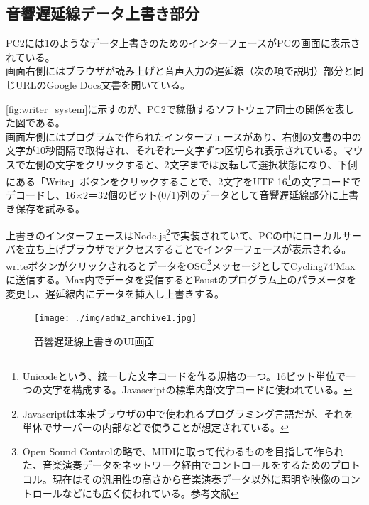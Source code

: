 \documentclass[a4paper,report]{jsbook}
\begin{document}
\subsection{音響遅延線データ上書き部分}\label{ux97f3ux97ffux9045ux5ef6ux7ddaux30c7ux30fcux30bfux4e0aux66f8ux304dux90e8ux5206}

PC2には\cref{fig:adm_writer}のようなデータ上書きのためのインターフェースがPCの画面に表示されている。\\
画面右側にはブラウザが読み上げと音声入力の遅延線（次の項で説明）部分と同じURLのGoogle
Docs文書を開いている。

\cref{fig:writer_system}に示すのが、PC2で稼働するソフトウェア同士の関係を表した図である。\\
画面左側にはプログラムで作られたインターフェースがあり、右側の文書の中の文字が10秒間隔で取得され、それぞれ一文字ずつ区切られ表示されている。マウスで左側の文字をクリックすると、2文字までは反転して選択状態になり、下側にある「Write」ボタンをクリックすることで、2文字をUTF-16\footnote{Unicodeという、統一した文字コードを作る規格の一つ。16ビット単位で一つの文字を構成する。Javascriptの標準内部文字コードに使われている。}の文字コードでデコードし、16×2＝32個のビット(0/1)列のデータとして音響遅延線部分に上書き保存を試みる。

上書きのインターフェースはNode.js\footnote{Javascriptは本来ブラウザの中で使われるプログラミング言語だが、それを単体でサーバーの内部などで使うことが想定されている。}で実装されていて、PCの中にローカルサーバを立ち上げブラウザでアクセスすることでインターフェースが表示される。writeボタンがクリックされるとデータをOSC\footnote{Open
  Sound
  Controlの略で、MIDIに取って代わるものを目指して作られた、音楽演奏データをネットワーク経由でコントロールをするためのプロトコル。現在はその汎用性の高さから音楽演奏データ以外に照明や映像のコントロールなどにも広く使われている。参考文献\autocite{wright2003opensound}}メッセージとしてCycling74'Maxに送信する。Max内でデータを受信するとFaustのプログラム上のパラメータを変更し、遅延線内にデータを挿入し上書きする。

\begin{figure}[htbp]
\centering
\texttt{[image: ./img/adm2\_archive1.jpg]}
\caption{音響遅延線上書きのUI画面\label{fig:adm_writer}}
\end{figure}
\end{document}
